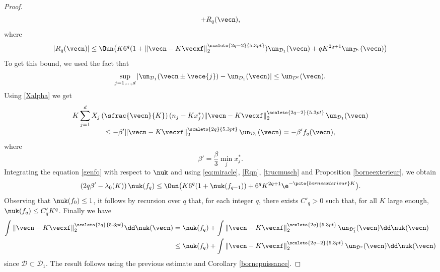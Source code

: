 \begin{proof}
\begin{equation}
+R_q(\vecn),
\end{equation}
where
\begin{equation}\label{Rqn}
|R_q(\vecn)|\leq \Oun\bigl(K 6^q (1+\|\vecn-K\vecxf\|_{2}^{\scaleto{2q-2}{5.3pt}}) \un_{\mathcal{D}_1}(\vecn) + q K^{2q+1} \un_{\mathcal{D}^c}(\vecn)\bigr)
\end{equation}
To get this bound, we used the fact that
\[
\sup_{j=1,\ldots, d} |\un_{\mathcal{D}_1}(\vecn\pm \vece{j})-\un_{\mathcal{D}_1}(\vecn)|\leq \un_{\mathcal{D}^c}(\vecn).
\]
Using \eqref{Xalpha} we get
\begin{multline}\label{trucmusch}
K \sum_{j=1}^d X_j\left(\sfrac{\vecn}{K}\right) (n_j-Kx_j^*) \|\vecn - K\vecxf\|_{2}^{\scaleto{2q-2}{5.3pt}} \,\un_{\mathcal{D}_1}(\vecn)\\[-5pt]
\leq -\beta' \|\vecn - K\vecxf\|_{2}^{\scaleto{2q}{5.3pt}} \,\un_{\mathcal{D}_1}(\vecn) = -\beta' f_q(\vecn),
\end{multline}
where
\[
\beta'= \frac{\beta}{3} \min_j x_j^*.
\]
Integrating the equation \eqref{genfq} with respect to $\nuk$ and using \eqref{eq:miracle}, \eqref{Rqn}, \eqref{trucmusch} and Proposition \ref{borneexterieur},
we obtain
\[
(2q\beta'-\lambda_0(K))\,\nuk(f_q)\leq \Oun\bigl(K 6^q(1+\nuk(f_{q-1}))+ 6^q K^{2q+1} \e^{-\pcte{borneexterieur} K}\bigr).
\]
Observing that $\nuk(f_0)\leq 1$, it follows by recursion over $q$ that, for each integer $q$, there exists $C'_q>0$
such that, for all $K$ large enough, $\nuk(f_q)\leq C'_q K^q$. Finally we have
\begin{align*}
\int \|\vecn-K\vecxf\|_{2}^{\scaleto{2q}{5.3pt}} \dd\nuk(\vecn)
& = \nuk(f_q) +\int \|\vecn-K\vecxf\|_{2}^{\scaleto{2q}{5.3pt}}\,\un_{\mathcal{D}_1^c}(\vecn) \dd\nuk(\vecn)\\
& \leq \nuk(f_q) +\int\|\vecn-K\vecxf\|_{2}^{\scaleto{2q-2}{5.3pt}}\,\un_{\mathcal{D}^c}(\vecn)\dd\nuk(\vecn)
\end{align*}
since $\mathcal{D}\subset \mathcal{D}_1$.
The result follows using the previous estimate and Corollary \ref{bornepuissance}.
\end{proof}

